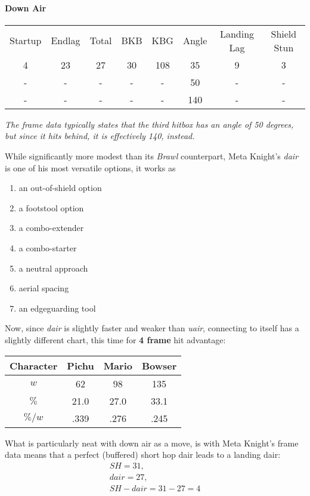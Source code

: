 \paragraph{Down Air}
\begin{center}
	\begin{tabular}{| c  c  c | c  c  c | c  c |}
		\hline
		Startup	& Endlag & Total & BKB & KBG & Angle &	Landing Lag	&	Shield Stun	\\
		4	&	23	&	27	&	30	&	108 & 	35\deg	&	9 	&	3	\\
		-	&	-	&	-	&	- 	& 	- 	&	50\deg	&	-	&	-	\\
		-	&	-	&	-	&	-	&	-	&	140\deg &	-	&	-	\\
		\hline
	\end{tabular}
	
	\emph{The frame data typically states that the third hitbox has an angle of 50 degrees, but since it hits behind, it is effectively 140\deg, instead.}
\end{center}
While significantly more modest than its \textit{Brawl} counterpart, Meta Knight's \textit{dair} is one of his most versatile options, it works as
	\begin{enumerate}[label = \roman*.]
		\item an out-of-shield option
		\item a footstool option
		\item a combo-extender
		\item a combo-starter
		\item a neutral approach
		\item aerial spacing
		\item an edgeguarding tool
	\end{enumerate}
	Now, since \textit{dair} is slightly faster and weaker than \textit{uair}, connecting to itself has a slightly different chart, this time for \textbf{4 frame} hit advantage:
	\begin{center}
		\begin{tabular}{| c c c c |}
			\hline
			\textbf{Character} & Pichu & Mario & Bowser	\\
			\hline
			$w$		&	62		&	98		&	135		\\
			$\%$	&	21.0	&	27.0	&	33.1	\\
			$\%/w$	&	.339	&	.276	&	.245	\\
			\hline
		\end{tabular}
	\end{center}
	What is particularly neat with down air as a move, is with Meta Knight's frame data means that a perfect (buffered) short hop dair leads to a landing dair:
	\begin{gather*}
		SH = 31,\\ dair = 27,\\ SH - dair = 31 - 27 = 4
	\end{gather*}
